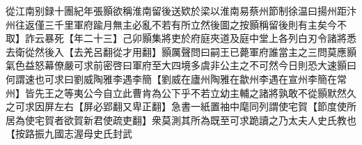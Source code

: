 從江南别録十團紀年張顥欲稱淮南留後送欵於梁以淮南易蔡州節制徐温曰揚州距汴州往返僅三千里軍府踰月無主必亂不若有所立然後圖之按顥稱留後則有主矣今不取】詐云暴死【年二十三】己卯顥集將吏於府庭夾道及庭中堂上各列白刃令諸將悉去衛從然後入【去羌呂翻從才用翻】顥厲聲問曰嗣王已薨軍府誰當主之三問莫應顥氣色益怒幕僚嚴可求前密啓曰軍府至大四境多虞非公主之不可然今日則恐大速顥曰何謂速也可求曰劉威陶雅李遇李簡【劉威在廬州陶雅在歙州李遇在宣州李簡在常州】皆先王之等夷公今自立此曹肯為公下乎不若立幼主輔之諸將孰敢不從顥默然久之可求因屏左右【屏必郢翻又卑正翻】急書一紙置袖中麾同列謂使宅賀【節度使所居為使宅賀者欲賀新君使疏吏翻】衆莫測其所為既至可求跪讀之乃太夫人史氏教也【按路振九國志渥母史氏封武
